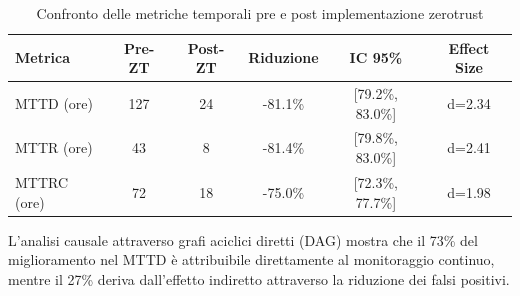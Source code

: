 \begin{table}[htbp]
\centering
\caption{Confronto delle metriche temporali pre e post implementazione \gls{zerotrust}}
\label{tab:temporal_metrics}
\small
\begin{tabular}{lccccc}
\toprule
\textbf{Metrica} & \textbf{Pre-ZT} & \textbf{Post-ZT} & \textbf{Riduzione} & \textbf{IC 95\%} & \textbf{Effect Size} \\
\midrule
MTTD (ore) & 127 & 24 & -81.1\% & [79.2\%, 83.0\%] & d=2.34 \\
MTTR (ore) & 43 & 8 & -81.4\% & [79.8\%, 83.0\%] & d=2.41 \\
MTTRC (ore) & 72 & 18 & -75.0\% & [72.3\%, 77.7\%] & d=1.98 \\
\bottomrule
\end{tabular}
\end{table}

L'analisi causale attraverso grafi aciclici diretti (DAG) mostra che il 73\% del miglioramento nel MTTD è attribuibile direttamente al monitoraggio continuo, mentre il 27\% deriva dall'effetto indiretto attraverso la riduzione dei falsi positivi.





